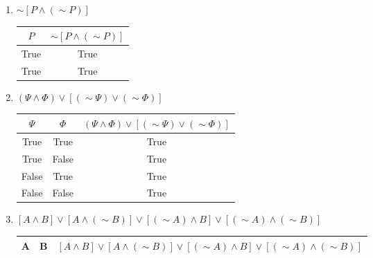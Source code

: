 \documentclass{letter}
\begin{document}
\begin{description}
\begin{enumerate}
\begin{enumerate}
				\item $\sim\left[P\wedge (\sim P)\right]$ \\
                                  \begin{center}
                                  \begin{tabular}{||c|c||}
                                    \hline
                                    $P$ & $\sim\left[P\wedge (\sim P)\right]$ \\ \hline
                                    True & True \\ \hline
                                    True & True \\ \hline
             
                                    \end{tabular}
                                    \end{center}
				\item $(\Psi \wedge \Phi)\vee \left[(\sim \Psi)\vee(\sim \Phi)\right]$ \\ 
                                \begin{center}
                                  \begin{tabular}{||c|c|c||}
                                    \hline
                                    $\Psi$ & $\Phi$ & $(\Psi \wedge \Phi)\vee \left[(\sim \Psi)\vee(\sim \Phi)\right]$ \\ \hline
                                    True & True & True \\ \hline
                                    True & False & True \\ \hline
                                    False & True & True \\ \hline
                                    False & False & True \\ \hline
                                    \end{tabular}
                                    \end{center}
				\item $[A\wedge B]\vee [A\wedge (\sim B)] \vee [(\sim A)\wedge B] \vee [(\sim A)\wedge (\sim B)]$ \\ 
                                  \begin{center}
                                  \begin{tabular}{||c|c|c||}
                                    \hline
                                     A & B &  $[A\wedge B]\vee [A\wedge (\sim B)] \vee [(\sim A)\wedge B] \vee [(\sim A)\wedge (\sim B)]$ \\ \hline

\end{tabular}
\end{center}
\end{enumerate}
\end{enumerate}
\end{description}
\end{document}
